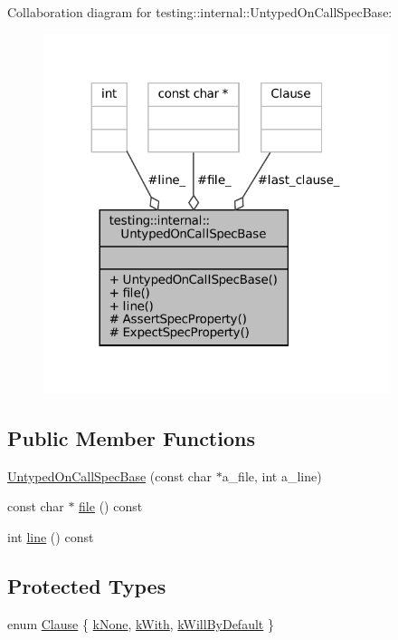 Collaboration diagram for testing\+:\+:internal\+:\+:Untyped\+On\+Call\+Spec\+Base\+:
\nopagebreak
\begin{figure}[H]
\begin{center}
\leavevmode
\includegraphics[width=287pt]{classtesting_1_1internal_1_1UntypedOnCallSpecBase__coll__graph}
\end{center}
\end{figure}
\subsection*{Public Member Functions}
\begin{DoxyCompactItemize}
\item 
\hyperlink{classtesting_1_1internal_1_1UntypedOnCallSpecBase_afc5da72d536ad61e2d66de87b2b9bc50}{Untyped\+On\+Call\+Spec\+Base} (const char $\ast$a\+\_\+file, int a\+\_\+line)
\item 
const char $\ast$ \hyperlink{classtesting_1_1internal_1_1UntypedOnCallSpecBase_a5ccb6ee1208ee597528b44c7c9945fa3}{file} () const
\item 
int \hyperlink{classtesting_1_1internal_1_1UntypedOnCallSpecBase_a18e9eb7155380b3e124bccc0d8115b5e}{line} () const
\end{DoxyCompactItemize}
\subsection*{Protected Types}
\begin{DoxyCompactItemize}
\item 
enum \hyperlink{classtesting_1_1internal_1_1UntypedOnCallSpecBase_a78ebf16bfee40375e33a983f3100f354}{Clause} \{ \hyperlink{classtesting_1_1internal_1_1UntypedOnCallSpecBase_a78ebf16bfee40375e33a983f3100f354a57f312c5eacf22518ff0b12405cde4f1}{k\+None}, 
\hyperlink{classtesting_1_1internal_1_1UntypedOnCallSpecBase_a78ebf16bfee40375e33a983f3100f354a451699b0beaaabb325f8eaf1c65a071d}{k\+With}, 
\hyperlink{classtesting_1_1internal_1_1UntypedOnCallSpecBase_a78ebf16bfee40375e33a983f3100f354aeb25a21e1aa3dc4ca3a108b5533d7eed}{k\+Will\+By\+Default}
 \}
\end{DoxyCompactItemize}
